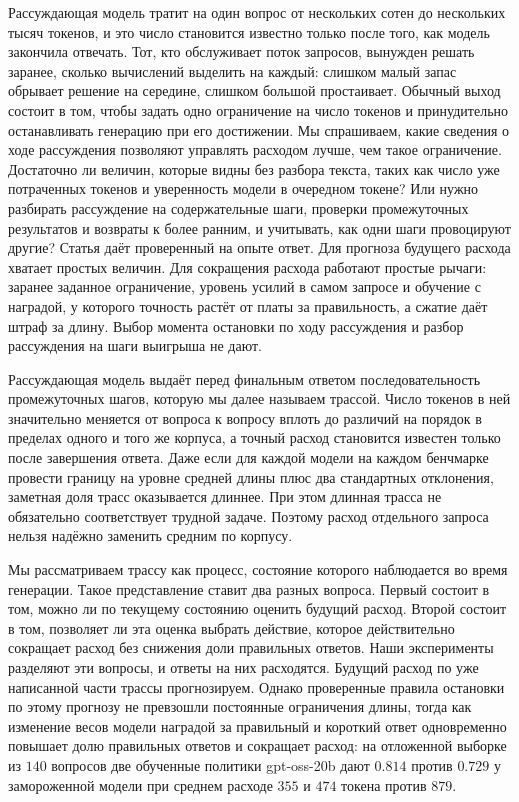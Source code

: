 \documentclass[11pt]{article}
\begin{document}
Рассуждающая модель тратит на один вопрос от нескольких сотен до нескольких тысяч токенов, и это число становится известно только после того, как модель закончила отвечать. Тот, кто обслуживает поток запросов, вынужден решать заранее, сколько вычислений выделить на каждый: слишком малый запас обрывает решение на середине, слишком большой простаивает. Обычный выход состоит в том, чтобы задать одно ограничение на число токенов и принудительно останавливать генерацию при его достижении. Мы спрашиваем, какие сведения о ходе рассуждения позволяют управлять расходом лучше, чем такое ограничение. Достаточно ли величин, которые видны без разбора текста, таких как число уже потраченных токенов и уверенность модели в очередном токене? Или нужно разбирать рассуждение на содержательные шаги, проверки промежуточных результатов и возвраты к более ранним, и учитывать, как одни шаги провоцируют другие? Статья даёт проверенный на опыте ответ. Для прогноза будущего расхода хватает простых величин. Для сокращения расхода работают простые рычаги: заранее заданное ограничение, уровень усилий в самом запросе и обучение с наградой, у которого точность растёт от платы за правильность, а сжатие даёт штраф за длину. Выбор момента остановки по ходу рассуждения и разбор рассуждения на шаги выигрыша не дают.

Рассуждающая модель выдаёт перед финальным ответом последовательность промежуточных шагов, которую мы далее называем трассой. Число токенов в ней значительно меняется от вопроса к вопросу вплоть до различий на порядок в пределах одного и того же корпуса, а точный расход становится известен только после завершения ответа. Даже если для каждой модели на каждом бенчмарке провести границу на уровне средней длины плюс два стандартных отклонения, заметная доля трасс оказывается длиннее. При этом длинная трасса не обязательно соответствует трудной задаче. Поэтому расход отдельного запроса нельзя надёжно заменить средним по корпусу.

Мы рассматриваем трассу как процесс, состояние которого наблюдается во время генерации. Такое представление ставит два разных вопроса. Первый состоит в том, можно ли по текущему состоянию оценить будущий расход. Второй состоит в том, позволяет ли эта оценка выбрать действие, которое действительно сокращает расход без снижения доли правильных ответов. Наши эксперименты разделяют эти вопросы, и ответы на них расходятся. Будущий расход по уже написанной части трассы прогнозируем. Однако проверенные правила остановки по этому прогнозу не превзошли постоянные ограничения длины, тогда как изменение весов модели наградой за правильный и короткий ответ одновременно повышает долю правильных ответов и сокращает расход: на отложенной выборке из $140$ вопросов две обученные политики gpt-oss-20b дают $0.814$ против $0.729$ у замороженной модели при среднем расходе $355$ и $474$ токена против $879$.
\end{document}
